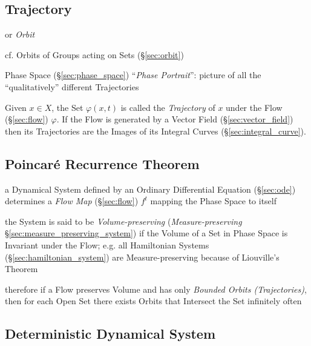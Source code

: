 \subsection{Trajectory}\label{sec:trajectory}

or \emph{Orbit}

\fist cf. Orbits of Groups acting on Sets (\S\ref{sec:orbit})

Phase Space (\S\ref{sec:phase_space}) ``\emph{Phase Portrait}'': picture of all
the ``qualitatively'' different Trajectories

Given $x \in X$, the Set $\varphi(x,t)$ is called the \emph{Trajectory} of $x$
under the Flow (\S\ref{sec:flow}) $\varphi$. If the Flow is generated by a
Vector Field (\S\ref{sec:vector_field}) then its Trajectories are the Images of
its Integral Curves (\S\ref{sec:integral_curve}).



\subsection{Poincar\'e Recurrence Theorem}\label{sec:poincare_recurrence}

a Dynamical System defined by an Ordinary Differential Equation
(\S\ref{sec:ode}) determines a \emph{Flow Map} (\S\ref{sec:flow}) $f^t$ mapping
the Phase Space to itself

the System is said to be \emph{Volume-preserving} (\emph{Measure-preserving}
\S\ref{sec:measure_preserving_system}) if the Volume of a Set in Phase Space is
Invariant under the Flow;
e.g. all Hamiltonian Systems (\S\ref{sec:hamiltonian_system}) are
Measure-preserving because of Liouville's Theorem

therefore if a Flow preserves Volume and has only \emph{Bounded Orbits
  (Trajectories)}, then for each Open Set there exists Orbits that Intersect
the Set infinitely often



\subsection{Deterministic Dynamical System}
\label{sec:deterministic_dynamical_system}

